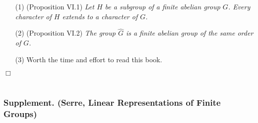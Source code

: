 \documentclass{article}
\begin{document}
\begin{enumerate}
\item[(1)]
  (Proposition VI.1)
  \emph{Let $H$ be a subgroup of a finite abelian group $G$.
  Every character of $H$ extends to a character of $G$.}

\item[(2)]
  (Proposition VI.2)
  \emph{The group $\widehat{G}$ is a finite abelian group of the same order of $G$.}

\item[(3)]
  Worth the time and effort to read this book.
\end{enumerate}
$\Box$ \\\\






\subsubsection*{Supplement. (Serre, Linear Representations of Finite Groups)}
\end{document}

